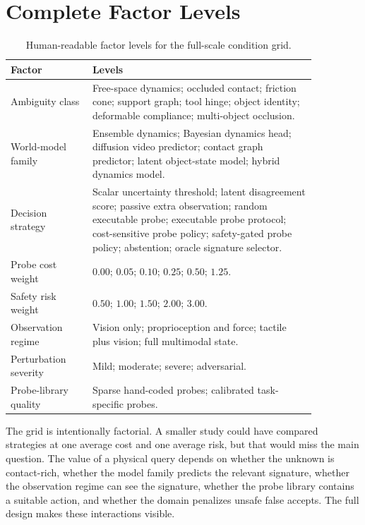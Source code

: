 \documentclass{article}
\begin{document}
\section{Complete Factor Levels}

\begin{table}[p]
\centering
\small
\begin{tabular}{p{0.23\linewidth}p{0.63\linewidth}}
\toprule
Factor & Levels \\
\midrule
Ambiguity class & Free-space dynamics; occluded contact; friction cone; support graph; tool hinge; object identity; deformable compliance; multi-object occlusion. \\
World-model family & Ensemble dynamics; Bayesian dynamics head; diffusion video predictor; contact graph predictor; latent object-state model; hybrid dynamics model. \\
Decision strategy & Scalar uncertainty threshold; latent disagreement score; passive extra observation; random executable probe; executable probe protocol; cost-sensitive probe policy; safety-gated probe policy; abstention; oracle signature selector. \\
Probe cost weight & $0.00$; $0.05$; $0.10$; $0.25$; $0.50$; $1.25$. \\
Safety risk weight & $0.50$; $1.00$; $1.50$; $2.00$; $3.00$. \\
Observation regime & Vision only; proprioception and force; tactile plus vision; full multimodal state. \\
Perturbation severity & Mild; moderate; severe; adversarial. \\
Probe-library quality & Sparse hand-coded probes; calibrated task-specific probes. \\
\bottomrule
\end{tabular}
\caption{Human-readable factor levels for the full-scale condition grid.}
\label{tab:complete_factor_levels}
\end{table}

The grid is intentionally factorial. A smaller study could have compared strategies at one average cost and one average risk, but that would miss the main question. The value of a physical query depends on whether the unknown is contact-rich, whether the model family predicts the relevant signature, whether the observation regime can see the signature, whether the probe library contains a suitable action, and whether the domain penalizes unsafe false accepts. The full design makes these interactions visible.
\end{document}
